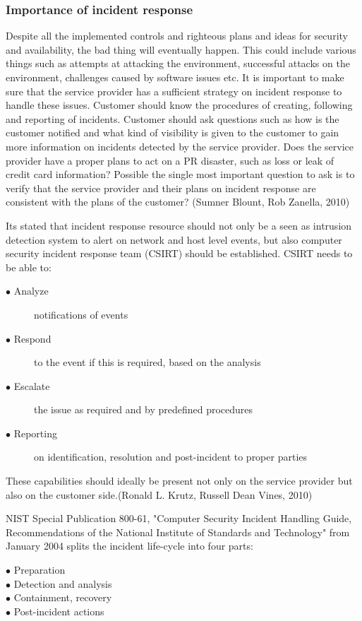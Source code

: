 \documentclass{article}
\begin{document}
\subsubsection{Importance of incident response}
Despite all the implemented controls and righteous plans and ideas for security and availability, the bad thing will eventually happen. This could include various things such as attempts at attacking the environment, successful attacks on the environment, challenges caused by software issues etc. It is important to make sure that the service provider has a sufficient strategy on incident response to handle these issues. Customer should know the procedures of creating, following and reporting of incidents. Customer should ask questions such as how is the customer notified and what kind of visibility is given to the customer to gain more information on incidents detected by the service provider. Does the service provider have a proper plans to act on a PR disaster, such as loss or leak of credit card information? Possible the single most important question to ask is to verify that the service provider and their plans on incident response are consistent with the plans of the customer? (Sumner Blount, Rob Zanella, 2010)
\par
Its stated that incident response resource should not only be a seen as intrusion detection system to alert on network and host level events, but also computer security incident response team (CSIRT) should be established. CSIRT needs to be able to:
\begin{description}
	\item[$\bullet$ Analyze] notifications of events
	\item[$\bullet$ Respond] to the event if this is required, based on the analysis
	\item[$\bullet$ Escalate] the issue as required and by predefined procedures
	\item[$\bullet$ Reporting] on identification, resolution and post-incident to proper parties
\end{description}
These capabilities should ideally be present not only on the service provider but also on the customer side.(Ronald L. Krutz, Russell Dean Vines, 2010)
\par
NIST Special Publication 800-61, "Computer Security Incident Handling Guide, Recommendations of the National Institute of Standards and Technology" from January 2004 splits the incident life-cycle into four parts:
\begin{description}
	\item[$\bullet$ Preparation]
	\item[$\bullet$ Detection and analysis]
	\item[$\bullet$ Containment, recovery]
	\item[$\bullet$ Post-incident actions]
\end{description}
\end{document}
